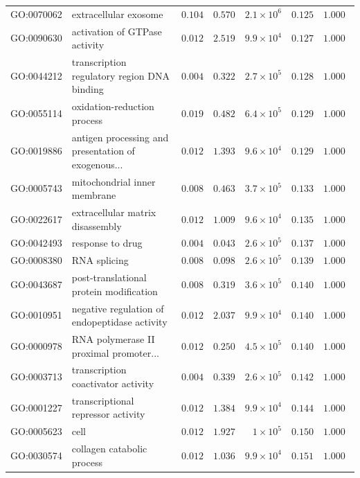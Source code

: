 \documentclass{article}
\begin{document}
\begin{center}
\begin{longtable*}{|l|l|r|r|r|r|r|}
            GO:0070062 & extracellular exosome & $ 0.104$ & $ 0.570$ & $2.1\times 10^{6}$ & $ 0.125$ & $ 1.000~~$ \\
            GO:0090630 & activation of GTPase activity & $ 0.012$ & $ 2.519$ & $9.9\times 10^{4}$ & $ 0.127$ & $ 1.000~~$ \\
            GO:0044212 & transcription regulatory region DNA binding & $ 0.004$ & $ 0.322$ & $2.7\times 10^{5}$ & $ 0.128$ & $ 1.000~~$ \\
            GO:0055114 & oxidation-reduction process & $ 0.019$ & $ 0.482$ & $6.4\times 10^{5}$ & $ 0.129$ & $ 1.000~~$ \\
            GO:0019886 & antigen processing and presentation of exogenous... & $ 0.012$ & $ 1.393$ & $9.6\times 10^{4}$ & $ 0.129$ & $ 1.000~~$ \\
            GO:0005743 & mitochondrial inner membrane & $ 0.008$ & $ 0.463$ & $3.7\times 10^{5}$ & $ 0.133$ & $ 1.000~~$ \\
            GO:0022617 & extracellular matrix disassembly & $ 0.012$ & $ 1.009$ & $9.6\times 10^{4}$ & $ 0.135$ & $ 1.000~~$ \\
            GO:0042493 & response to drug & $ 0.004$ & $ 0.043$ & $2.6\times 10^{5}$ & $ 0.137$ & $ 1.000~~$ \\
            GO:0008380 & RNA splicing & $ 0.008$ & $ 0.098$ & $2.6\times 10^{5}$ & $ 0.139$ & $ 1.000~~$ \\
            GO:0043687 & post-translational protein modification & $ 0.008$ & $ 0.319$ & $3.6\times 10^{5}$ & $ 0.140$ & $ 1.000~~$ \\
            GO:0010951 & negative regulation of endopeptidase activity & $ 0.012$ & $ 2.037$ & $9.9\times 10^{4}$ & $ 0.140$ & $ 1.000~~$ \\
            GO:0000978 & RNA polymerase II proximal promoter... & $ 0.012$ & $ 0.250$ & $4.5\times 10^{5}$ & $ 0.140$ & $ 1.000~~$ \\
            GO:0003713 & transcription coactivator activity & $ 0.004$ & $ 0.339$ & $2.6\times 10^{5}$ & $ 0.142$ & $ 1.000~~$ \\
            GO:0001227 & transcriptional repressor activity & $ 0.012$ & $ 1.384$ & $9.9\times 10^{4}$ & $ 0.144$ & $ 1.000~~$ \\
            GO:0005623 & cell & $ 0.012$ & $ 1.927$ & $ 1\times 10^{5}$ & $ 0.150$ & $ 1.000~~$ \\
            GO:0030574 & collagen catabolic process & $ 0.012$ & $ 1.036$ & $9.9\times 10^{4}$ & $ 0.151$ & $ 1.000~~$ \\

\end{longtable*}
\end{center}
\end{document}
